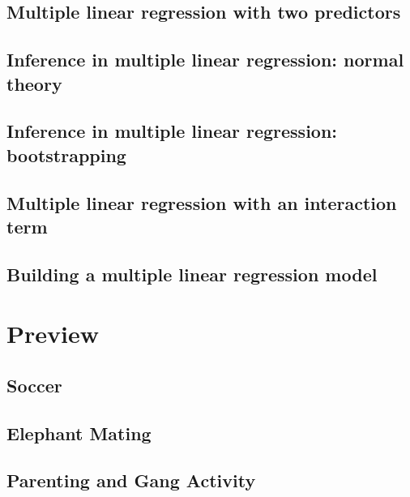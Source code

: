 \documentclass[
]{krantz}
\begin{document}
\hypertarget{multiple-linear-regression-with-two-predictors}{%
\subsection{Multiple linear regression with two predictors}\label{multiple-linear-regression-with-two-predictors}}

\hypertarget{multreg-inference}{%
\subsection{Inference in multiple linear regression: normal theory}\label{multreg-inference}}

\hypertarget{multreg-boot}{%
\subsection{Inference in multiple linear regression: bootstrapping}\label{multreg-boot}}

\hypertarget{multiple-linear-regression-with-an-interaction-term}{%
\subsection{Multiple linear regression with an interaction term}\label{multiple-linear-regression-with-an-interaction-term}}

\hypertarget{multreg_build}{%
\subsection{Building a multiple linear regression model}\label{multreg_build}}

\hypertarget{preview}{%
\section{Preview}\label{preview}}

\hypertarget{soccer}{%
\subsection{Soccer}\label{soccer}}

\hypertarget{elephant-mating}{%
\subsection{Elephant Mating}\label{elephant-mating}}

\hypertarget{parenting-and-gang-activity}{%
\subsection{Parenting and Gang Activity}\label{parenting-and-gang-activity}}
\end{document}
